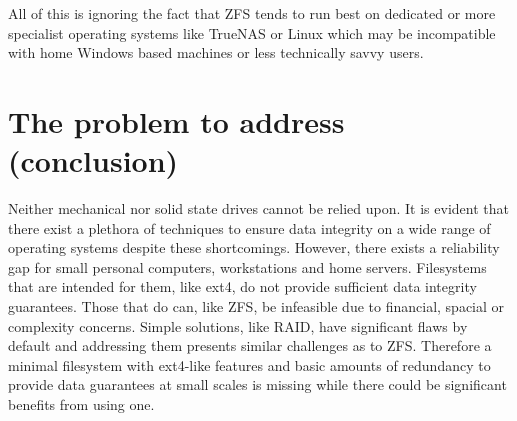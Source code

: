         All of this is ignoring the fact that ZFS tends to run best on
        dedicated or more specialist operating systems like TrueNAS or Linux
        which may be incompatible with home Windows based machines or less
        technically savvy users.

    \section{The problem to address (conclusion)}
        \label{sec:problem}

        Neither mechanical nor solid state drives cannot be relied upon. It is
        evident that there exist a plethora of techniques to ensure data
        integrity on a wide range of operating systems despite these
        shortcomings. However, there exists a reliability gap for small
        personal computers, workstations and home servers. Filesystems that are
        intended for them, like ext4, do not provide sufficient data integrity
        guarantees. Those that do can, like ZFS, be infeasible due to
        financial, spacial or complexity concerns. Simple solutions, like RAID,
        have significant flaws by default and addressing them presents similar
        challenges as to ZFS. Therefore a minimal filesystem with ext4-like
        features and basic amounts of redundancy to provide data guarantees at
        small scales is missing while there could be significant benefits from
        using one.
